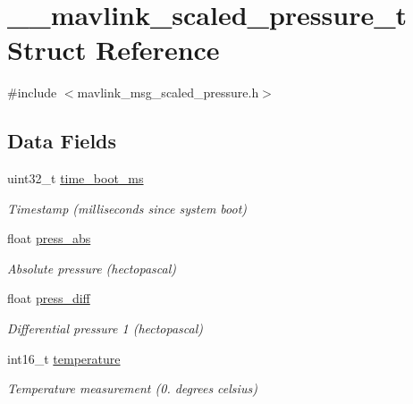 \hypertarget{struct____mavlink__scaled__pressure__t}{\section{\+\_\+\+\_\+mavlink\+\_\+scaled\+\_\+pressure\+\_\+t Struct Reference}
\label{struct____mavlink__scaled__pressure__t}
}


{\ttfamily \#include $<$mavlink\+\_\+msg\+\_\+scaled\+\_\+pressure.\+h$>$}

\subsection*{Data Fields}
\begin{DoxyCompactItemize}
\item 
uint32\+\_\+t \hyperlink{struct____mavlink__scaled__pressure__t_a86306943b70fe3c60db24d56c90daf70}{time\+\_\+boot\+\_\+ms}
\begin{DoxyCompactList}\small\item\em Timestamp (milliseconds since system boot) \end{DoxyCompactList}\item 
float \hyperlink{struct____mavlink__scaled__pressure__t_a934eb017154df68b78c6448a9c568d56}{press\+\_\+abs}
\begin{DoxyCompactList}\small\item\em Absolute pressure (hectopascal) \end{DoxyCompactList}\item 
float \hyperlink{struct____mavlink__scaled__pressure__t_a44d34c48be09332608a4d9dc36a809cb}{press\+\_\+diff}
\begin{DoxyCompactList}\small\item\em Differential pressure 1 (hectopascal) \end{DoxyCompactList}\item 
int16\+\_\+t \hyperlink{struct____mavlink__scaled__pressure__t_ac9c9eba0a5fce8ca9324859b1b9ab413}{temperature}
\begin{DoxyCompactList}\small\item\em Temperature measurement (0. degrees celsius) \end{DoxyCompactList}\end{DoxyCompactItemize}


